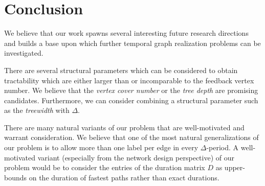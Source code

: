 \documentclass[a4paper,UKenglish,cleveref, autoref, thm-restate]{lipics-v2021}
\begin{document}
\section{Conclusion}\label{sec:conclusion}
We believe that our work spawns several interesting future research directions and builds a base upon which further temporal graph realization problems can be investigated.

There are several structural parameters which can be considered to obtain tractability which are either larger than or incomparable to the feedback vertex number. We believe that the \emph{vertex cover number} or the \emph{tree depth} are promising candidates.
Furthermore, we can consider combining a structural parameter such as the \emph{treewidth} with $\Delta$.

There are many natural variants of our problem that are well-motivated and warrant consideration. 
We believe that one of the most natural generalizations of our problem is to allow more than one label per edge in every $\Delta$-period. A well-motivated variant (especially from the network design perspective) of our problem would be to consider the entries of the duration matrix $D$ as upper-bounds on the duration of fastest paths rather than exact durations. 



	



\end{document}
